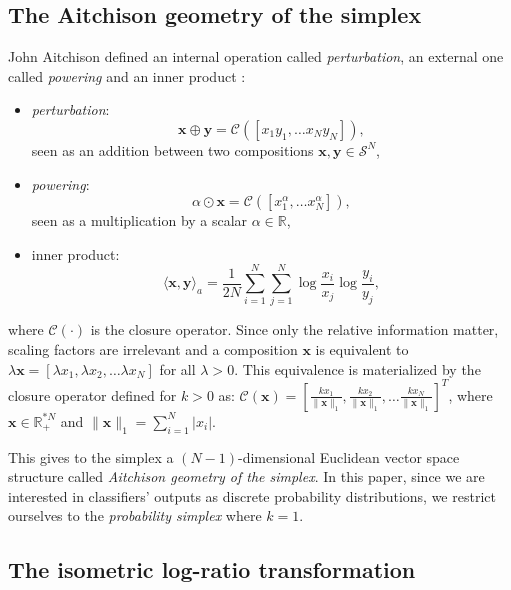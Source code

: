 \documentclass{article}
\theoremstyle{plain}
\theoremstyle{definition}
\theoremstyle{remark}
\begin{document}
\subsection{The Aitchison geometry of the simplex}
John Aitchison defined an internal operation called \emph{perturbation}, an external one called \emph{powering} and an inner product \cite{aitchison2001}:
\begin{itemize}
\item \emph{perturbation}:
  \begin{equation*}
    \bm{x}\oplus \bm{y} = \mathcal{C}\left([x_1y_1,\dots x_{N}y_{N}]\right),
  \end{equation*}
  seen as an addition between two compositions $\bm{x},\bm{y}\in \mathcal{S}^N$,
\item \emph{powering}:
  \begin{equation*}
    \alpha \odot \bm{x} = \mathcal{C}\left([x_{1}^{\alpha},\dots x_{N}^{\alpha}]\right),
  \end{equation*}
  seen as a multiplication by a scalar $\alpha \in \mathbb{R}$,
\item inner product:
  \begin{equation*}
    \langle \bm{x},\bm{y} \rangle_a = \frac{1}{2N}\sum_{i=1}^{N} \sum_{j=1}^{N} \log \frac{x_i}{x_j}\log \frac{y_i}{y_j},
  \end{equation*}
\end{itemize}
where $\mathcal{C}(\cdot)$ is the closure operator. Since only the relative information matter, scaling factors are irrelevant and a composition $\bm{x}$ is equivalent to $\lambda \bm{x} = [\lambda x_1,\lambda x_2,\dots\lambda x_N]$ for all $\lambda>0$. This equivalence is materialized by the closure operator defined for $k>0$ as: $\mathcal{C}\left(\bm{x} \right) = \left[ \frac{k x_1}{\lVert \bm{x} \rVert_1}, \frac{k x_2}{\lVert \bm{x} \rVert_1} ,\dots \frac{k x_N}{\lVert \bm{x} \rVert_1} \right]^T$, where $\bm{x} \in \mathbb{R}_+^{*N}$ and $\displaystyle \lVert \bm{x} \rVert_1 = \sum_{i=1}^N \lvert x_i \rvert$.%

This gives to the simplex a $(N-1)$-dimensional Euclidean vector space structure called \emph{Aitchison geometry of the simplex}. In this paper, since we are interested in classifiers' outputs as discrete probability distributions, we restrict ourselves to the \emph{probability simplex} where $k=1$.

\subsection{The isometric log-ratio transformation}
\label{sec:ilr}
\end{document}
